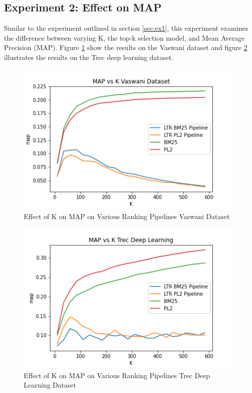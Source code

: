 \documentclass[letterpaper,12pt]{article}
\begin{document}
\subsection{Experiment 2: Effect on MAP}

Similar to the experiment outlined in section \ref{sec:ex1}, this experiment examines the difference between varying K, the top-k selection model, and Mean Average Precision (MAP).
Figure \ref{fig:ex_map_vaswani} show the results on the Vaswani dataset and figure \ref{fig:ex_map_deep} illustrates the results on the Trec deep learning dataset.


\begin{figure}[h!]
    \centering  %
    \includegraphics[width=.81\textwidth]{MAP-vs-K-Vaswani-Dataset.png} %
    \caption{Effect of K on MAP on Various Ranking Pipelines Vaswani Dataset} %
    \label{fig:ex_map_vaswani} %
\end{figure}

\begin{figure}[h!]
    \centering  %
    \includegraphics[width=.81\textwidth]{MAP-vs-K-Trec-Deep-Learning.png} %
    \caption{Effect of K on MAP on Various Ranking Pipelines Trec Deep Learning Dataset} %
    \label{fig:ex_map_deep} %
\end{figure}
\end{document}
